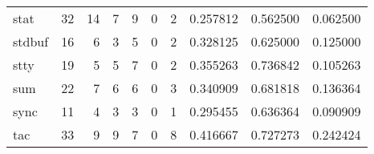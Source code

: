 \begin{longtable}{lrrrrrrrrr}
stat      &                                      32 &                                                 14 &                                                  7 &                                                  9 &                                                  0 &                                                  2 &                                           0.257812 &                               0.562500 &                             0.062500 \\
stdbuf    &                                      16 &                                                  6 &                                                  3 &                                                  5 &                                                  0 &                                                  2 &                                           0.328125 &                               0.625000 &                             0.125000 \\
stty      &                                      19 &                                                  5 &                                                  5 &                                                  7 &                                                  0 &                                                  2 &                                           0.355263 &                               0.736842 &                             0.105263 \\
sum       &                                      22 &                                                  7 &                                                  6 &                                                  6 &                                                  0 &                                                  3 &                                           0.340909 &                               0.681818 &                             0.136364 \\
sync      &                                      11 &                                                  4 &                                                  3 &                                                  3 &                                                  0 &                                                  1 &                                           0.295455 &                               0.636364 &                             0.090909 \\
tac       &                                      33 &                                                  9 &                                                  9 &                                                  7 &                                                  0 &                                                  8 &                                           0.416667 &                               0.727273 &                             0.242424 \\

\end{longtable}
